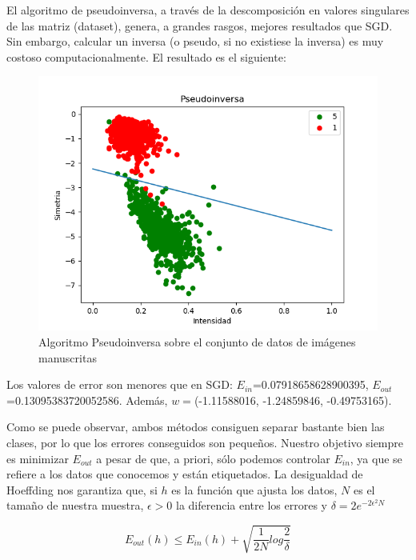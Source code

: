 El algoritmo de pseudoinversa, a través de la descomposición en valores singulares de las matriz (dataset), genera, a grandes rasgos, mejores resultados que SGD. Sin embargo, calcular un inversa (o pseudo, si no existiese la inversa) es muy costoso computacionalmente. El resultado es el siguiente:

\begin{figure}[H] %
	\centering
	\includegraphics[scale=0.6]{pseudoinversa.png}  %
	\caption{Algoritmo Pseudoinversa sobre el conjunto de datos de imágenes manuscritas} 
	\label{fig:pseud}
\end{figure}

Los valores de error son menores que en SGD: $E_{in}$=0.07918658628900395, $E_{out}$=0.13095383720052586. Además, $w=$(-1.11588016, -1.24859846, -0.49753165).

Como se puede observar, ambos métodos consiguen separar bastante bien las clases, por lo que los errores conseguidos son pequeños. Nuestro objetivo siempre es minimizar $E_{out}$ a pesar de que, a priori, sólo podemos controlar $E_{in}$, ya que se refiere a los datos que conocemos y están etiquetados. La desigualdad de Hoeffding nos garantiza que, si $h$ es la función que ajusta los datos, $N$ es el tamaño de nuestra muestra, $\epsilon>0$ la diferencia entre los errores y $\delta = 2e^{-2\epsilon^2N}$

$$ E_{out}(h) \leq E_{in}(h) + \sqrt{\frac{1}{2N} log \frac{2}{\delta}}$$

